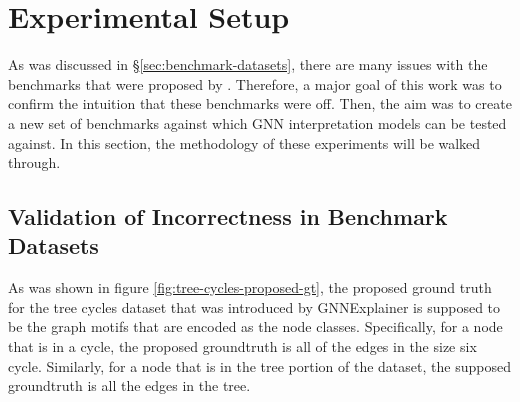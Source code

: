 \section{Experimental Setup}
As was discussed in \S\ref{sec:benchmark-datasets}, there are many issues with the benchmarks that were proposed by \cite{yuan_explainability_2021}. Therefore, a major goal of this work was to confirm the intuition that these benchmarks were off. Then, the aim was to create a new set of benchmarks against which GNN interpretation models can be tested against. In this section, the methodology of these experiments will be walked through.

\subsection{Validation of Incorrectness in Benchmark Datasets}
As was shown in figure \ref{fig:tree-cycles-proposed-gt}, the proposed ground truth for the tree cycles dataset that was introduced by GNNExplainer is supposed to be the graph motifs that are encoded as the node classes. Specifically, for a node that is in a cycle, the proposed groundtruth is all of the edges in the size six cycle. Similarly, for a node that is in the tree portion of the dataset, the supposed groundtruth is all the edges in the tree. 

